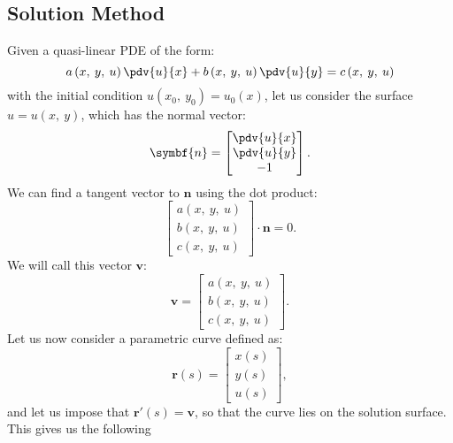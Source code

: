 \documentclass{article}
\theoremstyle{definition}
\begin{document}
\subsection{Solution Method}
Given a quasi-linear PDE of the form:
\begin{equation*}
    a\left( x,\: y,\: u \right) \pdv{u}{x} + b\left( x,\: y,\: u \right) \pdv{u}{y} = c\left( x,\: y,\: u \right)
\end{equation*}
with the initial condition \(u\left( x_0,\: y_0 \right) = u_0\left( x \right)\),
let us consider the surface \(u = u\left( x,\: y \right)\), which has
the normal vector:
\begin{equation*}
    \symbf{n} =
    \begin{bmatrix}
        \pdv{u}{x} \\
        \pdv{u}{y} \\
        -1
    \end{bmatrix}
    .
\end{equation*}
We can find a tangent vector to \(\symbf{n}\) using the dot product:
\begin{equation*}
    \begin{bmatrix}
        a\left( x,\: y,\: u \right) \\
        b\left( x,\: y,\: u \right) \\
        c\left( x,\: y,\: u \right)
    \end{bmatrix}
    \cdot
    \symbf{n}
    = 0.
\end{equation*}
We will call this vector \(\symbf{v}\):
\begin{equation*}
    \symbf{v} =
    \begin{bmatrix}
        a\left( x,\: y,\: u \right) \\
        b\left( x,\: y,\: u \right) \\
        c\left( x,\: y,\: u \right)
    \end{bmatrix}
    .
\end{equation*}
Let us now consider a parametric curve defined as:
\begin{equation*}
    \symbf{r}\left( s \right) =
    \begin{bmatrix}
        x\left( s \right) \\
        y\left( s \right) \\
        u\left( s \right)
    \end{bmatrix}
    ,
\end{equation*}
and let us impose that \(\symbf{r}'\left( s \right) = \symbf{v}\), so
that the curve lies on the solution surface. This gives us the following
\end{document}

